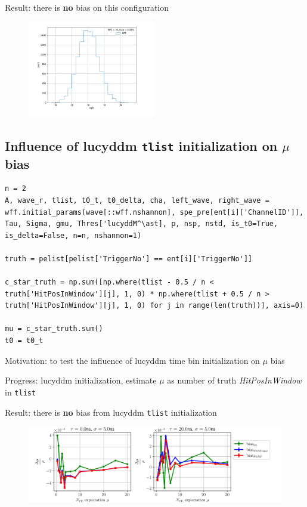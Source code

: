 \documentclass[notitlepage]{article}
\begin{document}
Result: there is \textbf{no} bias on this configuration

\begin{figure}[H]
    \centering
    \includegraphics[width=0.5\textwidth]{toybias.png}
\end{figure}

\subsection{Influence of lucyddm \texttt{tlist} initialization on $\mu$ bias}

\begin{lstlisting}
n = 2
A, wave_r, tlist, t0_t, t0_delta, cha, left_wave, right_wave = wff.initial_params(wave[::wff.nshannon], spe_pre[ent[i]['ChannelID']], Tau, Sigma, gmu, Thres['lucyddM^\ast], p, nsp, nstd, is_t0=True, is_delta=False, n=n, nshannon=1)

truth = pelist[pelist['TriggerNo'] == ent[i]['TriggerNo']]

c_star_truth = np.sum([np.where(tlist - 0.5 / n < truth['HitPosInWindow'][j], 1, 0) * np.where(tlist + 0.5 / n > truth['HitPosInWindow'][j], 1, 0) for j in range(len(truth))], axis=0)

mu = c_star_truth.sum()
t0 = t0_t
\end{lstlisting}

Motivation: to test the influence of lucyddm time bin initialization on $\mu$ bias

Progress: lucyddm initialization, estimate $\mu$ as number of truth \textit{HitPosInWindow} in \texttt{tlist}

Result: there is \textbf{no} bias from lucyddm \texttt{tlist} initialization

\begin{figure}[H]
    \centering
    \includegraphics[width=\textwidth]{vs-biasmu-lucyddmtlist.png}
\end{figure}
\end{document}
